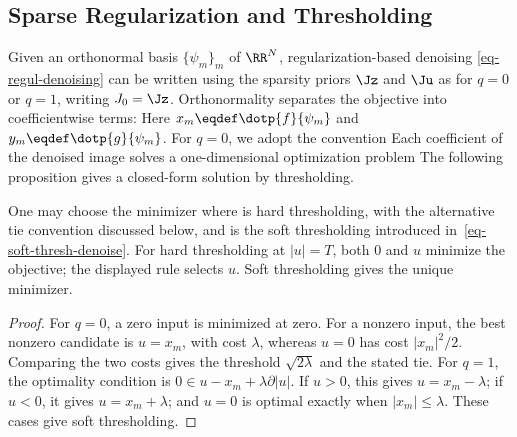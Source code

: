\subsection{Sparse Regularization and Thresholding}

Given an orthonormal basis $\{\psi_m\}_m$ of $\RR^N$, regularization-based denoising \eqref{eq-regul-denoising} can be written using the sparsity priors $\Jz$ and $\Ju$ as
for $q=0$ or $q=1$, writing $J_0=\Jz$. Orthonormality separates the objective into coefficientwise terms:
Here $x_m \eqdef \dotp{f}{\psi_m}$ and $y_m \eqdef \dotp{g}{\psi_m}$. For $q=0$, we adopt the convention
Each coefficient of the denoised image solves a one-dimensional optimization problem
The following proposition gives a closed-form solution by thresholding.

\begin{prop}\label{prop-equiv-sparse-thresh}
One may choose the minimizer
where 
is hard thresholding, with the alternative tie convention discussed below, and
is the soft thresholding introduced in~\eqref{eq-soft-thresh-denoise}. For hard thresholding at $|u|=T$, both $0$ and $u$ minimize the objective; the displayed rule selects $u$. Soft thresholding gives the unique minimizer.
\end{prop}

	
\begin{proof}
For $q=0$, a zero input is minimized at zero. For a nonzero input, the best nonzero candidate is $u=x_m$, with cost $\lambda$, whereas $u=0$ has cost $|x_m|^2/2$. Comparing the two costs gives the threshold $\sqrt{2\lambda}$ and the stated tie.
For $q=1$, the optimality condition is $0\in u-x_m+\lambda\partial|u|$. If $u>0$, this gives $u=x_m-\lambda$; if $u<0$, it gives $u=x_m+\lambda$; and $u=0$ is optimal exactly when $|x_m|\leq\lambda$. These cases give soft thresholding.

\end{proof}

